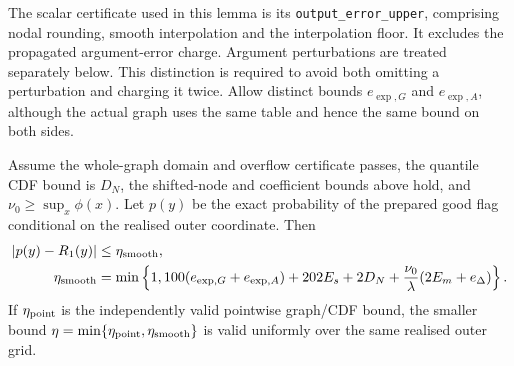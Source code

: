 The scalar certificate used in this lemma is its
\texttt{output\_error\_upper}, comprising nodal rounding, smooth
interpolation and the interpolation floor. It excludes the propagated
argument-error charge. Argument perturbations are treated separately
below. This distinction is required to avoid both omitting a perturbation
and charging it twice. Allow distinct bounds $e_{\exp,G}$ and
$e_{\exp,A}$, although the actual graph uses the same table and hence the
same bound on both sides.

\begin{theorem}
\label{thm:raw-smoothing-first}
Assume the whole-graph domain and overflow certificate passes, the
quantile CDF bound is $D_N$, the shifted-node and coefficient bounds above
hold, and $\nu_0\geq\sup_x\phi(x)$. Let $p(y)$ be the exact probability
of the prepared good flag conditional on the realised outer coordinate.
Then
\begin{align*}
 |p(y)-R_1(y)|
 &\leq\eta_{\rm smooth},\\
 \eta_{\rm smooth}
 &=\min\left\{1,
     100(e_{\exp,G}+e_{\exp,A})+202E_s+2D_N
     +\frac{\nu_0}{\lambda}(2E_m+e_\Delta)\right\}.
\end{align*}
If $\eta_{\rm point}$ is the independently valid pointwise graph/CDF
bound, the smaller bound
$\eta=\min\{\eta_{\rm point},\eta_{\rm smooth}\}$ is valid uniformly
over the same realised outer grid.
\end{theorem}
